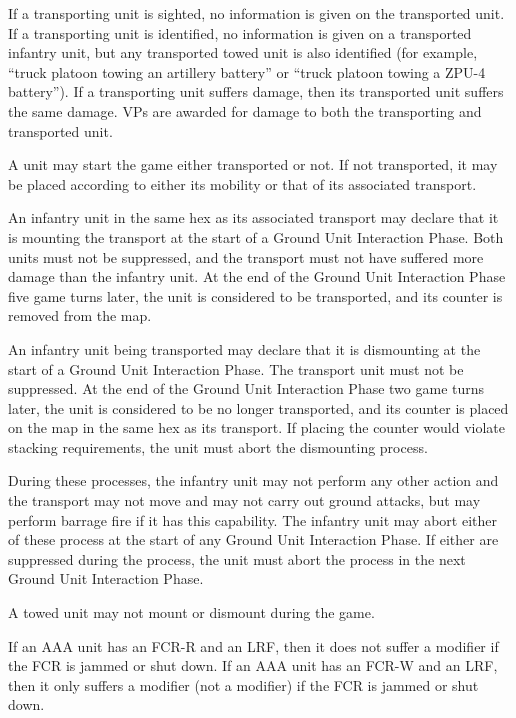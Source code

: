 
If a transporting unit is sighted, no information is given on the transported unit. If a transporting unit is identified, no information is given on a transported infantry unit, but any transported towed unit is also identified (for example, “truck platoon towing an artillery battery” or “truck platoon towing a ZPU-4 battery”). If a transporting unit suffers damage, then its transported unit suffers the same damage.
VPs are awarded for damage to both the transporting and transported unit.


A unit may start the game either transported or not. If not transported, it may be placed according to either its mobility or that of its associated transport.%

An infantry unit in the same hex as its associated transport may declare that it is mounting the transport at the start of a Ground Unit Interaction Phase.
Both units must not be suppressed, and the transport must not have suffered more damage than the infantry unit.
At the end of the Ground Unit Interaction Phase five game turns later, the unit is considered to be transported, and its counter is removed from the map.

An infantry unit being transported may declare that it is dismounting at the start of a Ground Unit Interaction Phase.
The transport unit must not be suppressed.
At the end of the Ground Unit Interaction Phase two game turns later, the unit is considered to be no longer transported, and its counter is placed on the map in the same hex as its transport.
If placing the counter would violate stacking requirements, the unit must abort the dismounting process.

During these processes, the infantry unit may not perform any other action and the transport may not move and may not carry out ground attacks, but may perform barrage fire if it has this capability.
The infantry unit may abort either of these process at the start of any Ground Unit Interaction Phase.
If either are suppressed during the process, the unit must abort the process in the next Ground Unit Interaction Phase.%

A towed unit may not mount or dismount during the game.


If an AAA unit has an FCR-R and an LRF, then it does not suffer a  modifier if the FCR is jammed or shut down.
If an AAA unit has an FCR-W and an LRF, then it only suffers a  modifier (not a  modifier) if the FCR is jammed or shut down.
